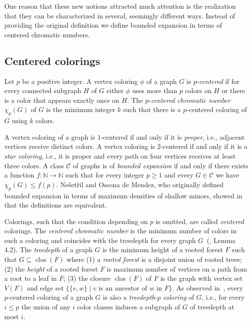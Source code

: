 \documentclass[11pt]{article}
\begin{document}
One reason that these new notions attracted much attention 
is the realization that they can be characterized in several, 
seemingly different ways.
Instead of providing the original definition 
we define bounded expansion in terms of centered chromatic numbers.
\subsection{Centered colorings}
Let $p$ be a positive integer.
A vertex coloring $\phi$ of a graph $G$ is $p$-\emph{centered}
if for every connected subgraph $H$ of $G$ 
either $\phi$ uses more than $p$ colors on $H$ or there is a color
that appears exactly once on $H$.
The $p$-\emph{centered chromatic number} $\chi_p(G)$ of $G$ is the minimum integer $k$ 
such that there is a $p$-centered coloring of $G$ using $k$ colors.

A vertex coloring of a graph is $1$-centered if and only if 
it is \emph{proper}, i.e.,  
adjacent vertices receive distinct colors.
A vertex coloring is $2$-centered if and only if it is a \emph{star coloring}, 
i.e., it is proper and every path on four vertices receives at least three colors.
A class $\mathcal{C}$ of graphs is of \emph{bounded expansion} if and only if 
there exists a function $f:\mathbb{N}\to\mathbb{N}$ such that
for every integer $p\geq1$ and every $G\in\mathcal{C}$ we have
$\chi_p(G)\leq f(p)$. 
Ne{\v{s}}et{\v{r}}il and Ossona de
Mendez, who originally defined bounded expansion in terms of maximum densities 
of shallow minors, 
showed in~\cite{NOdM08} that the definitions are equivalent.

Colorings, such that the condition depending on $p$ is omitted, are called \emph{centered}
colorings. The \emph{centered chromatic number} is the minimum number of colors in such a
coloring and coincides with the treedepth for every graph $G$~(\cite{NOdM06}, Lemma 4.2).
The \emph{treedepth} of a graph $G$ is the minimum height of a rooted forest 
$F$ such that $G\subseteq \operatorname{clos}(F)$ where 
(1) a \emph{rooted forest} is a
disjoint union of rooted trees; 
(2) the \emph{height} of a rooted forest $F$ is maximum number of vertices on 
a path from a root to a leaf in $F$;
(3) the closure $\operatorname{clos}(F)$ of $F$ is the graph with vertex set $V(F)$ and 
edge set $\{\{v,w\}\mid \text{$v$ is an ancestor of $w$ in $F$}\}$.
As observed in~\cite{NOdM06},  every $p$-centered coloring of a graph $G$ 
is also a \emph{treedepth}-$p$ \emph{coloring} of $G$, i.e., for every $i\leq p$
the union of any $i$ color classes induces a subgraph of $G$ of treedepth at most $i$.
\end{document}
